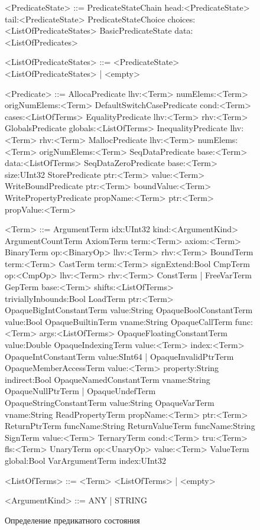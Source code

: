 \begin{figure}
	\begin{grammar}
	\scriptsize
	<PredicateState> ::= PredicateStateChain head:<PredicateState> tail:<PredicateState>
	\alt PredicateStateChoice choices:<ListOfPredicateStates>
	\alt BasicPredicateState data:<ListOfPredicates>

	<ListOfPredicateStates> ::= <PredicateState> <ListOfPredicateStates> | <empty>

	<Predicate> ::= AllocaPredicate lhv:<Term> numElems:<Term> origNumElems:<Term>
	\alt DefaultSwitchCasePredicate cond:<Term> cases:<ListOfTerms>
	\alt EqualityPredicate lhv:<Term> rhv:<Term>
	\alt GlobalsPredicate globals:<ListOfTerms>
	\alt InequalityPredicate lhv:<Term> rhv:<Term>
	\alt MallocPredicate lhv:<Term> numElems:<Term> origNumElems:<Term>
	\alt SeqDataPredicate base:<Term> data:<ListOfTerms>
	\alt SeqDataZeroPredicate base:<Term> size:UInt32
	\alt StorePredicate ptr:<Term> value:<Term>
	\alt WriteBoundPredicate ptr:<Term> boundValue:<Term>
	\alt WritePropertyPredicate propName:<Term> ptr:<Term> propValue:<Term>
	
	<Term> ::= ArgumentTerm idx:UInt32 kind:<ArgumentKind>
	\alt ArgumentCountTerm
	\alt AxiomTerm term:<Term> axiom:<Term>
	\alt BinaryTerm op:<BinaryOp> lhv:<Term> rhv:<Term>
	\alt BoundTerm term:<Term>
	\alt CastTerm term:<Term> signExtend:Bool
	\alt CmpTerm op:<CmpOp> lhv:<Term> rhv:<Term>
	\alt ConstTerm | FreeVarTerm
	\alt GepTerm base:<Term> shifts:<ListOfTerms> triviallyInbounds:Bool
	\alt LoadTerm ptr:<Term>
	\alt OpaqueBigIntConstantTerm value:String
	\alt OpaqueBoolConstantTerm value:Bool
	\alt OpaqueBuiltinTerm vname:String
	\alt OpaqueCallTerm func:<Term> args:<ListOfTerms>
	\alt OpaqueFloatingConstantTerm value:Double
	\alt OpaqueIndexingTerm value:<Term> index:<Term>
	\alt OpaqueIntConstantTerm value:SInt64 | OpaqueInvalidPtrTerm
	\alt OpaqueMemberAccessTerm value:<Term> property:String indirect:Bool
	\alt OpaqueNamedConstantTerm vname:String
	\alt OpaqueNullPtrTerm | OpaqueUndefTerm 
	\alt OpaqueStringConstantTerm value:String
	\alt OpaqueVarTerm vname:String
	\alt ReadPropertyTerm propName:<Term> ptr:<Term>
	\alt ReturnPtrTerm funcName:String
	\alt ReturnValueTerm funcName:String
	\alt SignTerm value:<Term>
	\alt TernaryTerm cond:<Term> tru:<Term> fls:<Term>
	\alt UnaryTerm op:<UnaryOp> value:<Term>
	\alt ValueTerm global:Bool
	\alt VarArgumentTerm index:UInt32

	<ListOfTerms> ::= <Term> <ListOfTerms> | <empty>

	<ArgumentKind> ::= ANY | STRING
	\end{grammar}
	
\caption{Определение предикатного состояния}
\label{image:predicate-state-definition}
\end{figure}

